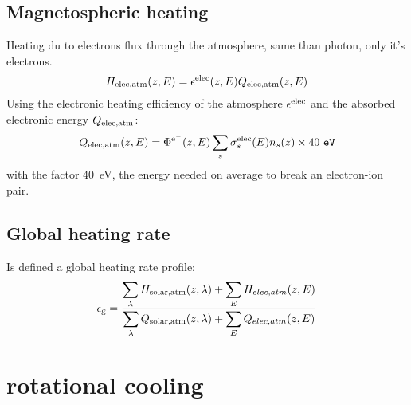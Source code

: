 \subsection{Magnetospheric heating}

Heating du to electrons flux through the atmosphere, same than
photon, only it's electrons.
\begin{equation}
H_{\text{elec,atm}}(z,E) = \epsilon^{\text{elec}}(z,E)Q_{\text{elec,atm}}(z,E)
\label{Titan:elec-heat-rate}
\end{equation}
Using the electronic heating efficiency of the atmosphere $\epsilon^{\text{elec}}$ and
the absorbed electronic energy $Q_{\text{elec,atm}}$:
\begin{equation}
\heat_{\text{elec,atm}}(z,E) = \fe(z,E)\sum_s \cs^{\text{elec}}_s(E)\conc_s(z) \times 40~\unit{eV}
\label{Titan:elec-heat}
\end{equation}
with the factor 40~\unit{eV}, the energy needed on average to break an
electron-ion pair.

\subsection{Global heating rate}

Is defined a global heating rate profile:
\begin{equation}
\epsilon_\text{g} = \frac{\displaystyle\sum_\lambda H_{\text{solar,atm}}(z,\lambda) + 
                          \displaystyle\sum_EH_{elec,atm}(z,E)}
                         {\displaystyle\sum_\lambda Q_{\text{solar,atm}}(z,\lambda) + 
                          \displaystyle\sum_EQ_{elec,atm}(z,E)}
\label{Titan:global-heat}
\end{equation}

\section{\texorpdfstring{ rotational cooling}{Hydrogen cyanide rotational cooling}}
